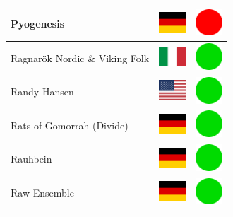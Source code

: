 \documentclass[12pt, a4paper, twoside]{report}
\begin{document}
\begin{center}
\begin{longtable}{|p{5cm}|p{2cm}|p{2cm}|}
 Pyogenesis                                                 & \includegraphics[width=1cm]{4x3/de} &   \includegraphics[width=1cm]{likes/n} \\ \hline
 Ragnarök Nordic \& Viking Folk                             & \includegraphics[width=1cm]{4x3/it} &   \includegraphics[width=1cm]{likes/y} \\ \hline
 Randy Hansen                                               & \includegraphics[width=1cm]{4x3/us} &   \includegraphics[width=1cm]{likes/y} \\ \hline
 Rats of Gomorrah (Divide)                                  & \includegraphics[width=1cm]{4x3/de} &   \includegraphics[width=1cm]{likes/y} \\ \hline
 Rauhbein                                                   & \includegraphics[width=1cm]{4x3/de} &   \includegraphics[width=1cm]{likes/y} \\ \hline
 Raw Ensemble                                               & \includegraphics[width=1cm]{4x3/de} &   \includegraphics[width=1cm]{likes/y} \\ \hline

\end{longtable}
\end{center}
\end{document}
